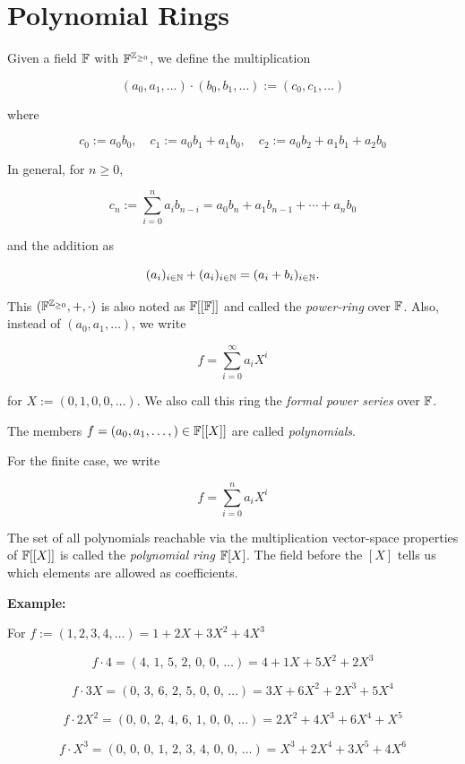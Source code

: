\section{Polynomial Rings}

Given a field \(\mathbb{F}\) with \(\mathbb{F}^{\mathbb{Z}_{\ge 0}}\), we define the multiplication

\[
	(a_0, a_1, \dots ) \cdot (b_0, b_1, \dots ) := (c_0, c_1, \dots)
\]

where

\[
	c_0 := a_0 b_0, \quad c_1:= a_0 b_1 + a_1 b_0, \quad c_2 := a_0 b_2 + a_1 b_1 + a_2 b_0
\]

In general, for \(n \ge 0\),

\[
	c_n := \sum_{i = 0}^{n} a_i b_{n - i} = a_0 b_{n} + a_1 b_{n - 1} + \cdots + a_n b_0
\]

and the addition as

\[
	(a_i)_{i \in \mathbb{N}} + (a_i)_{i \in \mathbb{N}} = (a_i + b_i)_{i \in \mathbb{N}}.
\]

This \((\mathbb{F}^{\mathbb{Z}_{\ge 0}}, +, \cdot)\) is also noted as \(\mathbb{F}[[\mathbb{F}]]\) and
called the \emph{power-ring} over \(\mathbb{F}\). Also, instead of \((a_0, a_1, \dots)\), we write

\[
	f = \sum_{i=0}^{\infty} a_i X^i
\]

for \(X := (0, 1, 0, 0, \dots)\). We also call this ring the \emph{formal power series} over \(\mathbb{F}\).

The members \(f = (a_0, a_1, \dots, ) \in \mathbb{F} [[X]]\) are called \emph{polynomials}.

For the finite case, we write

\[
	f = \sum_{i=0}^{n} a_i X^i
\]

The set of all polynomials reachable via the multiplication vector-space properties of \(\mathbb{F}[[X]]\) is
called the \emph{polynomial ring} \(\mathbb{F}[X]\). The field before the \([X]\) tells us which elements
are allowed as coefficients.

\textbf{Example:}

For \(f := (1,2,3,4, \dots) = 1 + 2X + 3X^2 + 4X^3 \)

\[
	f \cdot 4 = (4,\,1,\,5,\,2,\,0,\,0,\,\ldots) = 4 + 1X + 5X^{2} + 2X^{3}
\]

\[
	f \cdot 3X = (0,\,3,\,6,\,2,\,5,\,0,\,0,\,\ldots) = 3X + 6X^{2} + 2X^{3} + 5X^{4}
\]

\[
	f \cdot 2X^{2} = (0,\,0,\,2,\,4,\,6,\,1,\,0,\,0,\,\ldots) = 2X^{2} + 4X^{3} + 6X^{4} + X^{5}
\]

\[
	f \cdot X^{3} = (0,\,0,\,0,\,1,\,2,\,3,\,4,\,0,\,0,\,\ldots) = X^{3} + 2X^{4} + 3X^{5} + 4X^{6}
\]

